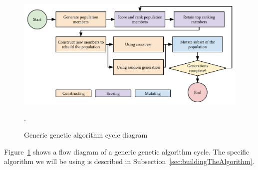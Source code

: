 \begin{figure}[ht]
    \centering
    \includegraphics[width=1.0\textwidth, center]{./img/flows/ga_cycle.pdf}
    \caption{Generic genetic algorithm cycle diagram}.\label{fig:genericGACycle} 
\end{figure}

Figure~\ref{fig:genericGACycle} shows a flow diagram of a generic genetic algorithm cycle.
The specific algorithm we will be using is described in Subsection~\ref{sec:buildingTheAlgorithm}.

